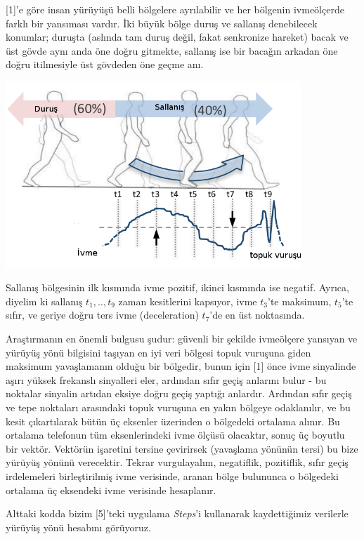 \documentclass[12pt,fleqn]{article}\usepackage{../../common}
\begin{document}
[1]'e göre insan yürüyüşü belli bölgelere ayrılabilir ve her bölgenin
ivmeölçerde farklı bir yansıması vardır. İki büyük bölge duruş ve sallanış
denebilecek konumlar; duruşta (aslında tam duruş değil, fakat senkronize
hareket) bacak ve üst gövde aynı anda öne doğru gitmekte, sallanış ise bir
bacağın arkadan öne doğru itilmesiyle üst gövdeden öne geçme anı.

\includegraphics[width=30em]{compscieng_app40walk_13.png}

Sallanış bölgesinin ilk kısmında ivme pozitif, ikinci kısmında ise
negatif. Ayrıca, diyelim ki sallanış $t_1,..,t_9$ zaman kesitlerini
kapsıyor, ivme $t_3$'te maksimum, $t_5$'te sıfır, ve geriye doğru ters ivme
(deceleration) $t_7$'de en üst noktasında.

Araştırmanın en önemli bulgusu şudur: güvenli bir şekilde ivmeölçere
yansıyan ve yürüyüş yönü bilgisini taşıyan en iyi veri bölgesi topuk
vuruşuna giden maksimum yavaşlamanın olduğu bir bölgedir, bunun için [1]
önce ivme sinyalinde aşırı yüksek frekanslı sinyalleri eler, ardından sıfır
geçiş anlarını bulur - bu noktalar sinyalin artıdan eksiye doğru geçiş
yaptığı anlardır. Ardından sıfır geçiş ve tepe noktaları arasındaki topuk
vuruşuna en yakın bölgeye odaklanılır, ve bu kesit çıkartılarak bütün üç
eksenler üzerinden o bölgedeki ortalama alınır. Bu ortalama telefonun tüm
eksenlerindeki ivme ölçüsü olacaktır, sonuç üç boyutlu bir vektör. Vektörün
işaretini tersine çevirirsek (yavaşlama yönünün tersi) bu bize yürüyüş
yönünü verecektir. Tekrar vurgulayalım, negatiflik, pozitiflik, sıfır geçiş
irdelemeleri birleştirilmiş ivme verisinde, aranan bölge bulununca o
bölgedeki ortalama üç eksendeki ivme verisinde hesaplanır.

Alttaki kodda bizim [5]'teki uygulama {\em Steps}'i kullanarak
kaydettiğimiz verilerle yürüyüş yönü hesabını görüyoruz.
\end{document}
